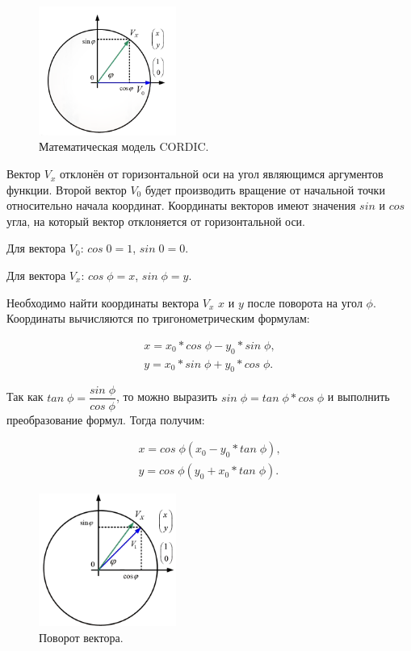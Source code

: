 	\begin{figure}[H]
    \centering
    \includegraphics[width=0.4\textwidth]{../image/cordic.png}
    \caption{Математическая модель CORDIC.}
	\end{figure}

	Вектор $V_{x}$ отклонён от горизонтальной оси на угол являющимся аргументов функции. Второй вектор $V_{0}$ будет производить вращение от начальной точки относительно начала координат. Координаты векторов имеют значения $sin$ и $cos$ угла, на который вектор отклоняется от горизонтальной оси. 

	Для вектора $V_{0}$: $cos\;0 = 1$, $sin\;0 = 0$. 

	Для вектора $V_{x}$: $cos\;\phi = x$, $sin\;\phi = y$.

	Необходимо найти координаты вектора $V_{x}$ $x$ и $y$ после поворота на угол $\phi$. Координаты вычисляются по тригонометрическим формулам:

	\begin{gather}
	x=x_{0}*cos\;\phi-y_{0}*sin\;\phi, \\
	y=x_{0}*sin\;\phi+y_{0}*cos\;\phi. 
	\end{gather}

	Так как $tan\;\phi=\dfrac{sin\;\phi}{cos\;\phi}$, то можно выразить $sin\;\phi=tan\;\phi*cos\;\phi$ и выполнить преобразование формул. Тогда получим:

	\begin{gather}
	x=cos\;\phi(x_{0}-y_{0}*tan\;\phi), \\
	y=cos\;\phi(y_{0}+x_{0}*tan\;\phi). 
	\end{gather}
	
	\begin{figure}[H]
    \centering
    \includegraphics[width=0.4\textwidth]{../image/cordic2.png}
    \caption{Поворот вектора.}
	\end{figure}

